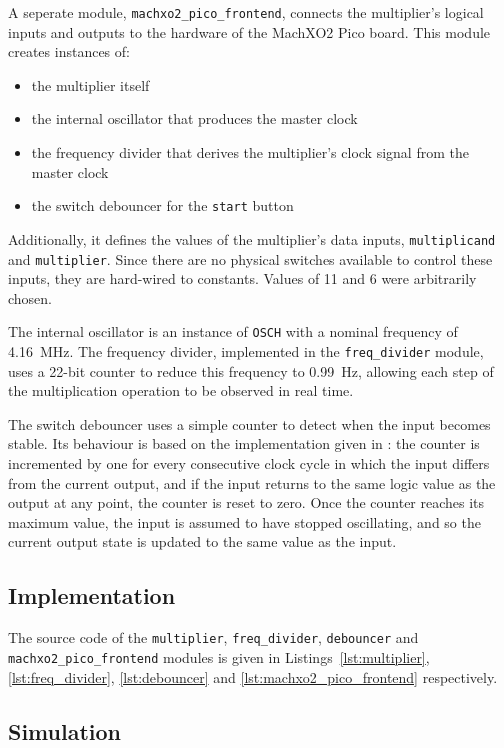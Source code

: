 \documentclass[a4paper]{article}
\begin{document}
A seperate module, \texttt{machxo2\_pico\_frontend}, connects the multiplier's logical inputs and outputs to the hardware of the MachXO2 Pico board. This module creates instances of:
\begin{itemize}
  \item the multiplier itself
  \item the internal oscillator that produces the master clock
  \item the frequency divider that derives the multiplier's clock signal from the master clock
  \item the switch debouncer for the \texttt{start} button
\end{itemize}
Additionally, it defines the values of the multiplier's data inputs, \texttt{multiplicand} and \texttt{multiplier}. Since there are no physical switches available to control these inputs, they are hard-wired to constants. Values of 11 and 6 were arbitrarily chosen.

The internal oscillator is an instance of \texttt{OSCH} with a nominal frequency of \SI{4.16}{\mega\hertz}. The frequency divider, implemented in the \texttt{freq\_divider} module, uses a 22-bit counter to reduce this frequency to \SI{0.99}{\hertz}, allowing each step of the multiplication operation to be observed in real time.

The switch debouncer uses a simple counter to detect when the input becomes stable. Its behaviour is based on the implementation given in \cite{debouncer}: the counter is incremented by one for every consecutive clock cycle in which the input differs from the current output, and if the input returns to the same logic value as the output at any point, the counter is reset to zero. Once the counter reaches its maximum value, the input is assumed to have stopped oscillating, and so the current output state is updated to the same value as the input.

\subsection{Implementation}
\label{sec:mult:impl}

The source code of the \texttt{multiplier}, \texttt{freq\_divider}, \texttt{debouncer} and \texttt{machxo2\_pico\_frontend} modules is given in Listings~\ref{lst:multiplier}, \ref{lst:freq_divider}, \ref{lst:debouncer} and \ref{lst:machxo2_pico_frontend} respectively.

\subsection{Simulation}
\label{sec:mult:sim}
\end{document}
